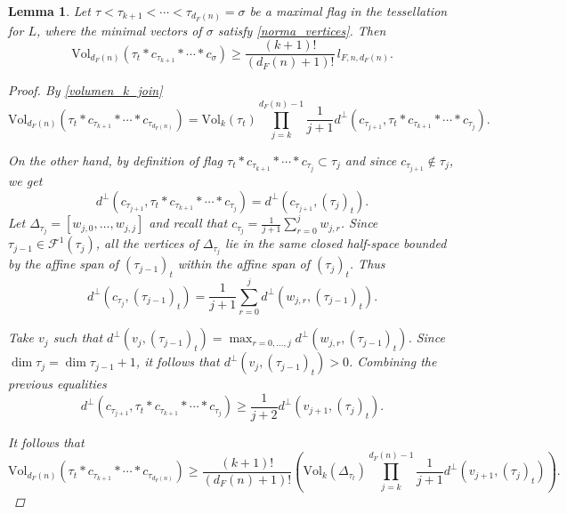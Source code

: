 \documentclass[11pt,a4paper,twoside]{amsart}
\theoremstyle{plain}
\newtheorem{lemma}[theorem]{\bfseries Lemma}
\theoremstyle{definition}
\newcommand{\vol}[0]{\mathrm{Vol}}
\renewcommand{\geq}{\geqslant}
\begin{document}
\begin{lemma}
\label{bound_vol_bar_subd}
Let $\tau<\tau_{k+1}<\cdots<\tau_{d_F(n)}=\sigma$ be a maximal flag in the tessellation for $L$, where the minimal vectors of $\sigma$ satisfy \eqref{norma_vertices}. Then
$$\vol_{d_F(n)}(\tau_t*c_{\tau_{k+1}}*\cdots*c_\sigma)\geq\frac{(k+1)!}{(d_F(n)+1)!}\,l_{F,n,d_F(n)}.$$

\begin{proof}
By \eqref{volumen_k_join}
$$\vol_{d_F(n)}(\tau_t * c_{\tau_{k+1}} * \cdots *  c_{\tau_{d_F(n)}}) = \vol_ k(\tau_t)\prod_{j = k}^{d_F(n)-1} \frac{1}{j+1} d^{\perp}(c_{\tau_{j+1}}, \tau_t * c_{\tau_{k+1}}*\cdots*c_{\tau_{j}}).$$

On the other hand, by definition of flag $\tau_t*c_{\tau_{k+1}}*\cdots*c_{\tau_j}\subset\tau_j$ and since $c_{\tau_{j+1}}\notin\tau_j$, we get
$$d^{\perp}(c_{\tau_{j+1}}, \tau_t * c_{\tau_{k+1}}*\cdots*c_{\tau_{j}}) = d^{\perp}(c_{\tau_{j+1}},(\tau_{j})_t).$$
Let $\Delta_{\tau_j} = [w_{j,0},\dots, w_{j,j}]$ and recall that $c_{\tau_j} = \frac{1}{j+1}\sum_{r=0}^j w_{j,r}$. Since $\tau_{j-1}\in\mathcal{F}^1(\tau_j)$, all the vertices of $\Delta_{\tau_j}$ lie in the same closed half-space bounded by the affine span of $(\tau_{j-1})_t$ within the affine span of $(\tau_j)_t$. Thus
$$d^{\perp}(c_{\tau_j},(\tau_{j-1})_t) = \frac{1}{j+1}\sum_{r=0}^j d^{\perp}(w_{j,r},(\tau_{j-1})_t).$$

Take $v_j$  such that $d^\perp(v_j, (\tau_{j-1})_t)= \max_{r=0,\dots,j} d^\perp (w_{j,r}, (\tau_{j-1})_t)$. Since $\dim \tau_{j} = \dim \tau_{j-1}+1$, it follows that $d^\perp(v_j, (\tau_{j-1})_t)>0$. Combining the previous equalities 
\begin{equation}\label{smart}
    d^{\perp}(c_{\tau_{j+1}}, \tau_t * c_{\tau_{k+1}}*\cdots*c_{\tau_{j}}) \geq \frac{1}{j+2} d^\perp (v_{j+1}, (\tau_j)_t).
\end{equation}

It follows that
\begin{equation}\label{eq1}
  \vol_{d_F(n)}(\tau_t * c_{\tau_{k+1}} * \cdots *  c_{\tau_{d_F(n)}}) \geq  \frac{(k+1)!}{(d_F(n)+1)!} \left(\vol_k(\Delta_{\tau_t}) \prod_{j = k}^{d_F(n)-1} \frac{1}{j+1}d^\perp  (v_{j+1}, (\tau_j)_t) \right).  
\end{equation}


\end{proof}
\end{lemma}
\end{document}
